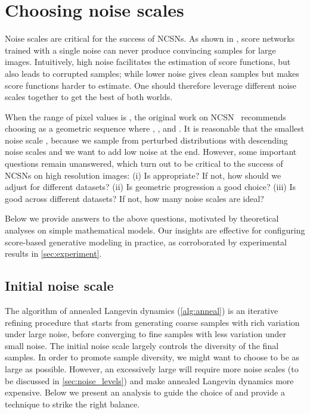 \documentclass{article}
\begin{document}
 \section{Choosing noise scales}
Noise scales are critical for the success of NCSNs. As shown in \cite{song2019generative}, score networks trained with a single noise can never produce convincing samples for large images. Intuitively, high noise facilitates the estimation of score functions, but also leads to corrupted samples; while lower noise gives clean samples but makes score functions harder to estimate. One should therefore leverage different noise scales together to get the best of both worlds.

When the range of pixel values is , the original work on NCSN~\cite{song2019generative} recommends choosing  as a geometric sequence where , , and . It is reasonable that the smallest noise scale , because we sample from perturbed distributions with descending noise scales and we want to add low noise at the end.
However, some important questions remain unanswered, which turn out to be critical to the success of NCSNs on high resolution images: (i) Is  appropriate? If not, how should we adjust  for different datasets? (ii) Is geometric progression a good choice? (iii) Is  good across different datasets? If not, how many noise scales are ideal? 

Below we provide answers to the above questions, motivated by theoretical analyses on simple mathematical models. Our insights are effective for configuring score-based generative modeling in practice, as corroborated by experimental results in \cref{sec:experiment}.


\subsection{Initial noise scale}
The algorithm of annealed Langevin dynamics (\cref{alg:anneal}) is an iterative refining procedure that starts from generating coarse samples with rich variation under large noise, before converging to fine samples with less variation under small noise. The initial noise scale  largely controls the diversity of the final samples. 
In order to promote sample diversity, we might want to choose  to be as large as possible. However, an excessively large  will require more noise scales (to be discussed in \cref{sec:noise_levels}) and make annealed Langevin dynamics more expensive. Below we present an analysis to guide the choice of  and provide a technique to strike the right balance.
\end{document}
